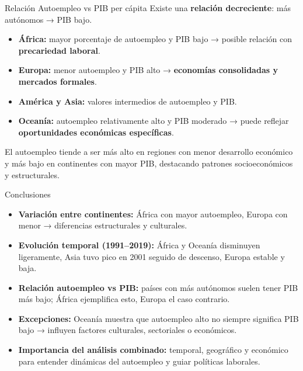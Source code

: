 \documentclass[
  ignorenonframetext,
]{beamer}
\providecommand{\tightlist}{%
  \setlength{\itemsep}{0pt}\setlength{\parskip}{0pt}}
\begin{document}
\begin{frame}{Relación Autoempleo vs PIB per cápita}
\label{relaciuxf3n-autoempleo-vs-pib-per-cuxe1pita}
Existe una \textbf{relación decreciente}: más autónomos → PIB bajo.

\begin{itemize}
\tightlist
\item
  \textbf{África:} mayor porcentaje de autoempleo y PIB bajo → posible
  relación con \textbf{precariedad laboral}.\\
\item
  \textbf{Europa:} menor autoempleo y PIB alto → \textbf{economías
  consolidadas y mercados formales}.\\
\item
  \textbf{América y Asia:} valores intermedios de autoempleo y PIB.\\
\item
  \textbf{Oceanía:} autoempleo relativamente alto y PIB moderado → puede
  reflejar \textbf{oportunidades económicas específicas}.
\end{itemize}

El autoempleo tiende a ser más alto en regiones con menor desarrollo
económico y más bajo en continentes con mayor PIB, destacando patrones
socioeconómicos y estructurales.
\end{frame}

\begin{frame}{Conclusiones}
\label{conclusiones}
\begin{itemize}
\item
  \textbf{Variación entre continentes:} África con mayor autoempleo,
  Europa con menor → diferencias estructurales y culturales.
\item
  \textbf{Evolución temporal (1991--2019):} África y Oceanía disminuyen
  ligeramente, Asia tuvo pico en 2001 seguido de descenso, Europa
  estable y baja.
\item
  \textbf{Relación autoempleo vs PIB:} países con más autónomos suelen
  tener PIB más bajo; África ejemplifica esto, Europa el caso contrario.
\item
  \textbf{Excepciones:} Oceanía muestra que autoempleo alto no siempre
  significa PIB bajo → influyen factores culturales, sectoriales o
  económicos.
\item
  \textbf{Importancia del análisis combinado:} temporal, geográfico y
  económico para entender dinámicas del autoempleo y guiar políticas
  laborales.
\end{itemize}
\end{frame}
\end{document}
